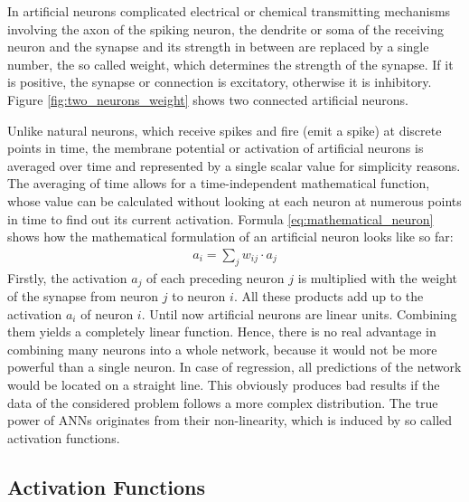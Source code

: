 \documentclass[11pt, a4paper]{article}
\begin{document}

\vspace{-0.2cm}
In artificial neurons complicated electrical or chemical transmitting mechanisms involving the axon of the spiking neuron, the dendrite or soma of the receiving neuron and the synapse and its strength in between are replaced by a single number, the so called weight, which determines the strength of the synapse. If it is positive, the synapse or connection is excitatory, otherwise it is inhibitory. Figure \ref{fig:two_neurons_weight} shows two connected artificial neurons.



 Unlike natural neurons, which receive spikes and fire (emit a spike) at discrete points in time, the membrane potential or activation of artificial neurons is averaged over time and represented by a single scalar value for simplicity reasons. The averaging of time allows for a time-independent mathematical function, whose value can be calculated without looking at each neuron at numerous points in time to find out its current activation. Formula \eqref{eq:mathematical_neuron} shows how the mathematical formulation of an artificial neuron looks like so far:
\begin{align}
\label{eq:mathematical_neuron}
a_i = \sum_j w_{ij} \cdot a_j
\end{align}
Firstly, the activation $a_j$ of each preceding neuron $j$ is multiplied with the weight of the synapse from neuron $j$ to neuron $i$. All these products add up to the activation $a_i$ of neuron $i$. Until now artificial neurons are linear units. Combining them yields a completely linear function. Hence, there is no real advantage in combining many neurons into a whole network, because it would not be more powerful than a single neuron. In case of regression, all predictions of the network would be located on a straight line. This obviously produces bad results if the data of the considered problem follows a more complex distribution. The true power of \acp{ANN} originates from their non-linearity, which is induced by so called activation functions.

\subsection{Activation Functions}
\end{document}
